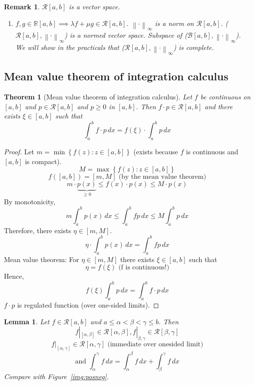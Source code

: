 \documentclass{article}
\newtheorem{theorem}{Theorem}  \numberwithin{theorem}{section}
\newtheorem{lemma}{Lemma}  \numberwithin{lemma}{section}
\newtheorem{remark}{Remark}  \numberwithin{remark}{section}
\newcommand{\set}[1]{\left\{#1\right\}}
\newcommand{\norm}[1]{\left\|#1\right\|}
\begin{document}
\begin{remark}
  $\mathcal R[a,b]$ is a vector space.

  \begin{enumerate}
    \item $f, g \in \mathbb R[a,b] \implies \lambda f + \mu g \in \mathcal R[a,b]$.
      $\norm{\cdot}_{\infty}$ is a norm on $\mathcal R[a,b]$.
      ($\mathcal R[a,b], \norm{\cdot}_{\infty}$) is a normed vector space.
      Subspace of ($\mathcal B[a,b], \norm{\cdot}_{\infty}$).
      We will show in the practicals that ($\mathcal R[a,b], \norm{\cdot}_{\infty}$) is complete.
  \end{enumerate}
\end{remark}

\subsection{Mean value theorem of integration calculus}

\begin{theorem}[Mean value theorem of integration calculus]
  \label{mvt} \label{satz3}
  Let $f$ be continuous on $[a,b]$ and $p \in \mathcal R[a,b]$
  and $p \geq 0$ in $[a,b]$.
  Then $f \cdot p \in \mathcal R[a,b]$ and there exists $\xi \in [a,b]$ such that
  \[ \int_a^b f \cdot p \, dx = f(\xi) \cdot \int_a^b p \, dx \]
\end{theorem}
\begin{proof}
  Let $m = \min\set{f(z): z \in [a,b]}$ (exists because $f$ is continuous and $[a,b]$ is compact).
  \[ M = \max\set{f(z): z \in [a,b]} \]
  \[ f([a,b]) = [m, M] \text{ (by the mean value theorem)} \]
  \[ m \cdot \underbrace{p(x)}_{\geq 0} \leq f(x) \cdot p(x) \leq M \cdot p(x) \]
  By monotonicity,
  \[ m \int_a^b p(x) \, dx \leq \int_a^b fp \, dx \leq M \int_a^b p \, dx \]
  Therefore, there exists $\eta \in [m, M]$.
  \[ \eta \cdot \int_a^b p(x) \, dx = \int_a^b fp \, dx \]
  Mean value theorem: For $\eta \in [m,M]$ there exists $\xi \in [a,b]$ such that
  \[ \eta = f(\xi) \text{ (f is continuous!)} \]
  Hence,
  \[ f(\xi) \int_a^b p \, dx = \int_a^b f \cdot p \, dx \]
  $f \cdot p$ is regulated function (over one-sided limits).
\end{proof}

\begin{lemma} %
  Let $f \in \mathcal R[a,b]$ and $a \leq \alpha < \beta < \gamma \leq b$.
  Then
  \[ f|_{[\alpha,\beta]} \in \mathcal R[\alpha,\beta], f|_{\beta,\gamma} \in \mathcal R[\beta,\gamma] \]
  \[ f|_{[\alpha,\gamma]} \in \mathcal R[\alpha,\gamma] \text{ (immediate over onesided limit)} \]
  \[ \text{and } \int_{\alpha}^\gamma f\, dx = \int_{\alpha}^\beta f \, dx + \int_\beta^\gamma f \, dx \]
  Compare with Figure~\ref{img:posneg}.
\end{lemma}
\end{document}
